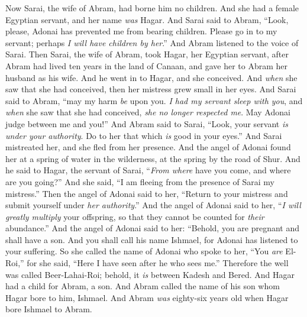 \begin{biblechapter} %
 Now Sarai, the wife of Abram, had borne him no children. And she had a female Egyptian servant, and her name \textit{was} Hagar.
\verse And Sarai said to Abram, “Look, please, Adonai has prevented me from bearing children. Please go in to my servant; perhaps \textit{I will have children by her}.” And Abram listened to the voice of Sarai.
\verse Then Sarai, the wife of Abram, took Hagar, her Egyptian servant, after Abram had lived ten years in the land of Canaan, and gave her to Abram her husband as his wife.
\verse And he went in to Hagar, and she conceived. And \textit{when} she saw that she had conceived, then her mistress grew small in her eyes.
\verse And Sarai said to Abram, “may my harm \textit{be} upon you. \textit{I had my servant sleep with you}, and \textit{when} she saw that she had conceived, \textit{she no longer respected me}. May Adonai judge between me and you!”
\verse And Abram said to Sarai, “Look, your servant \textit{is} \textit{under your authority}. Do to her that which \textit{is} good in your eyes.” And Sarai mistreated her, and she fled from her presence.
 And the angel of Adonai found her at a spring of water in the wilderness, at the spring by the road of Shur.
\verse And he said to Hagar, the servant of Sarai, “\textit{From where} have you come, and where are you going?” And she said, “I am fleeing from the presence of Sarai my mistress.”
\verse Then the angel of Adonai said to her, “Return to your mistress and submit yourself under \textit{her authority}.”
\verse And the angel of Adonai said to her, “\textit{I will greatly multiply} your offspring, so that they cannot be counted for \textit{their} abundance.”
\verse And the angel of Adonai said to her:
\verse “Behold, you are pregnant 
and shall have a son. 
And you shall call his name Ishmael, 
for Adonai has listened to your suffering.
\verse So she called the name of Adonai who spoke to her, “You \textit{are} El-Roi,” for she said, “Here I have seen after he who sees me.”
\verse Therefore the well was called Beer-Lahai-Roi; behold, it \textit{is} between Kadesh and Bered.
\verse And Hagar had a child for Abram, a son. And Abram called the name of his son whom Hagar bore to him, Ishmael.
\verse And Abram \textit{was} eighty-six years old when Hagar bore Ishmael to Abram.
\end{biblechapter}

